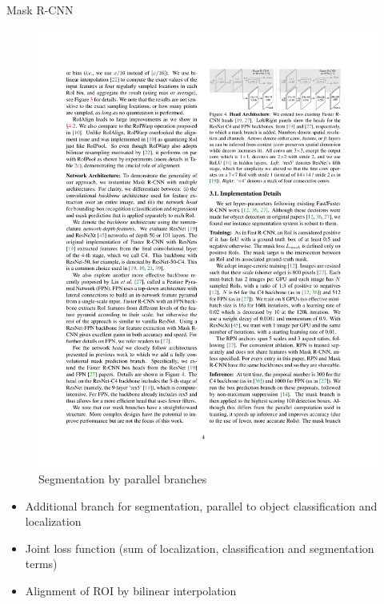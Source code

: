 \documentclass[xcolor=pdftex,dvipsnames,table]{beamer}
\begin{document}
\begin{frame}{Mask R-CNN}
\begin{figure}[htb]
   \centering
   \includegraphics[width=.7\textwidth]{../graphics/Mask_RCNN_parallel.pdf}
   \caption{Segmentation by parallel branches}
\end{figure}
\begin{itemize}
\item Additional branch for segmentation, parallel to object classification and localization
\item Joint loss function (sum of localization, classification and segmentation terms)
\item Alignment of ROI by bilinear interpolation
\end{itemize}
\end{frame}
\end{document}
